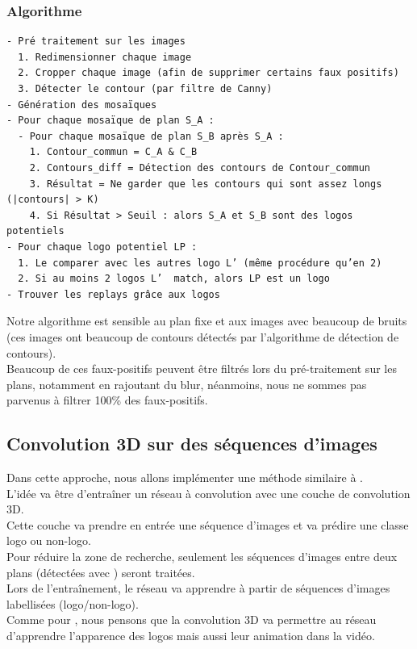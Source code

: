 \documentclass[11pt]{article}
\begin{document}
\subsubsection{Algorithme}
\label{sec:org83b6e19}
\begin{verbatim}
- Pré traitement sur les images
  1. Redimensionner chaque image
  2. Cropper chaque image (afin de supprimer certains faux positifs)
  3. Détecter le contour (par filtre de Canny)
- Génération des mosaïques
- Pour chaque mosaïque de plan S_A :
  - Pour chaque mosaïque de plan S_B après S_A :
    1. Contour_commun = C_A & C_B
    2. Contours_diff = Détection des contours de Contour_commun
    3. Résultat = Ne garder que les contours qui sont assez longs (|contours| > K)
    4. Si Résultat > Seuil : alors S_A et S_B sont des logos potentiels
- Pour chaque logo potentiel LP :
  1. Le comparer avec les autres logo L’ (même procédure qu’en 2)
  2. Si au moins 2 logos L’  match, alors LP est un logo
- Trouver les replays grâce aux logos
\end{verbatim}

Notre algorithme est sensible au plan fixe et aux images avec beaucoup de bruits (ces images ont beaucoup de contours détectés par l’algorithme de détection de contours).\\
Beaucoup de ces faux-positifs peuvent être filtrés lors du pré-traitement sur les plans, notamment en rajoutant du blur, néanmoins, nous ne sommes pas parvenus à filtrer 100\% des faux-positifs.\\

\subsection{Convolution 3D sur des séquences d'images}
\label{sec:orge16e0d8}
Dans cette approche, nous allons implémenter une méthode similaire à \cite{Tran_2015}.\\
L'idée va être d'entraîner un réseau à convolution avec une couche de convolution 3D.\\
Cette couche va prendre en entrée une séquence d'images et va prédire une classe logo ou non-logo.\\
Pour réduire la zone de recherche, seulement les séquences d'images entre deux plans (détectées avec \cite{Abd_Almageed_2008}) seront traitées.\\
Lors de l'entraînement, le réseau va apprendre à partir de séquences d'images labellisées (logo/non-logo).\\
Comme pour \cite{Tran_2015}, nous pensons que la convolution 3D va permettre au réseau d'apprendre l'apparence des logos mais aussi leur animation dans la vidéo.\\
\end{document}
